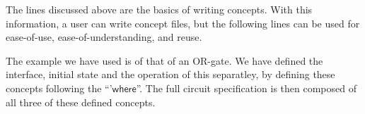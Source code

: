 \documentclass[british,conference,compsoc]{IEEEtran}
\newcommand{\noun}[1]{\textsc{#1}}
\begin{document}
\vspace{-1mm}

The lines discussed above are the basics of writing concepts. With this 
information, a user can write concept files, but the following lines can be 
used for ease-of-use, ease-of-understanding, and reuse. 

The example we have used is of that of an OR-gate. We have defined the 
interface, initial state and the operation of this separatley, by defining 
these concepts following the ``'$\mathsf{where}$''. The full circuit 
specification is then composed of all three of these defined concepts. 

%
%
%
%
%
%
%
%
\end{document}
